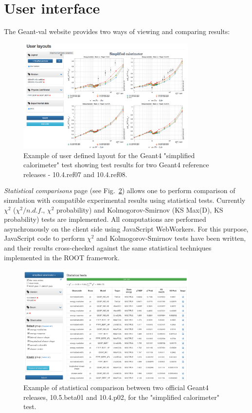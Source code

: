 \section{User interface}
\label{sec-analyse}

The \textsf{Geant-val} website provides two ways of viewing and comparing results:

\begin{figure}[h]
    \centering
    \includegraphics[width=0.8\textwidth,clip]{layout_sc.png}
    \caption{Example of user defined layout for the Geant4 "simplified calorimeter" test showing test results for two Geant4 reference releases - 10.4.ref07 and 10.4.ref08.}
    \label{fig:layouts}
\end{figure}

\textit{Statistical comparisons} page (see Fig.~\ref{fig:statcomparison}) allows one to perform comparison of simulation with compatible experimental results using statistical tests. %
Currently $\chi^2$ ($\chi^2/n.d.f.$, $\chi^2$ probability) and Kolmogorov-Smirnov (KS Max(D), KS probability) tests are implemented. All computations are performed asynchronously on the client side using JavaScript WebWorkers. For this purpose, JavaScript code to perform $\chi^2$ and Kolmogorov-Smirnov tests have been written, and their results cross-checked against the same statistical techniques implemented in the ROOT framework.

\begin{figure}[h]
    \centering
    \includegraphics[width=0.8\textwidth,clip]{statcomparison.png}
    \caption{Example of statistical comparison between two official Geant4 releases, 10.5.beta01 and 10.4.p02, for the "simplified calorimeter" test.}
    \label{fig:statcomparison}
\end{figure}

